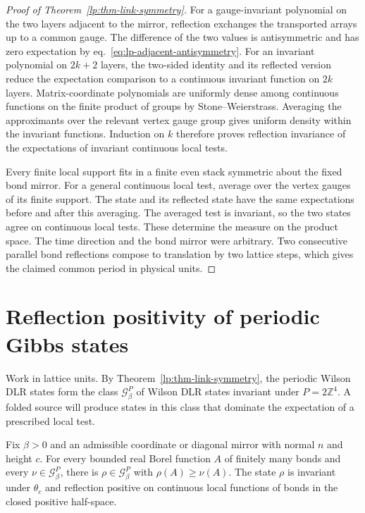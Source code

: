 \documentclass[11pt,letterpaper,reqno]{amsart}
\makeatletter
\numberwithin{equation}{section}
\renewcommand{\eqref}[1]{\textup{eq.~\ref{#1}}}
\theoremstyle{definition}
\newcommand{\ms@minorstart}{%
  \pushQED{\qed}\renewcommand{\qedsymbol}{$\blacksquare$}}
\newenvironment{lemma}[1][]{\ms@minorstart\ms@lemma[#1]}
  {\popQED\endms@lemma}
\theoremstyle{remark}
\makeatother
\begin{document}
\begin{proof}[Proof of Theorem~\ref{lp:thm-link-symmetry}]
For a gauge-invariant polynomial on the two layers adjacent to
the mirror, reflection exchanges the transported arrays up
to a common gauge. The difference of the two values is
antisymmetric and has zero expectation by
\eqref{eq:lp-adjacent-antisymmetry}. For an invariant polynomial
on \(2k+2\) layers, the two-sided identity and its reflected
version reduce the expectation comparison to a continuous
invariant function on \(2k\) layers. Matrix-coordinate
polynomials are uniformly dense among continuous functions
on the finite product of groups by Stone--Weierstrass.
Averaging the approximants over the relevant vertex gauge
group gives uniform density within the invariant functions.
Induction on \(k\) therefore proves reflection invariance of
the expectations of invariant continuous local tests.

Every finite local support fits in a finite even stack symmetric
about the fixed bond mirror. For a general continuous local test,
average over the vertex gauges of its finite support. The state and its reflected
state have the same expectations before and after this
averaging. The averaged test is invariant, so the two
states agree on continuous local tests. These determine the
measure on the product space. The time direction and the
bond mirror were arbitrary. Two consecutive parallel bond
reflections compose to translation by two lattice steps,
which gives the claimed common period in physical units.
\end{proof}

\section{Reflection positivity of periodic Gibbs states}
\label{lp:sec-fold}

Work in lattice units. By Theorem~\ref{lp:thm-link-symmetry},
the periodic Wilson DLR states form the class \(\mathcal G_\beta^P\)
of Wilson DLR states invariant under \(P=2\mathbb Z^4\). A folded
source will produce states in this class that dominate the
expectation of a prescribed local test.

\begin{lemma}[Domination by a reflected state]\label{lp:lem-fold-domination}
Fix \(\beta>0\) and an admissible coordinate or diagonal mirror
with normal \(n\) and height \(c\). For every bounded real Borel
function \(A\) of finitely many bonds and every
\(\nu\in\mathcal G_\beta^P\), there is
\(\rho\in\mathcal G_\beta^P\) with
\(\rho(A)\ge\nu(A)\). The state \(\rho\) is invariant under
\(\theta_c\) and reflection positive on continuous local functions
of bonds in the closed positive half-space.
\end{lemma}
\end{document}
